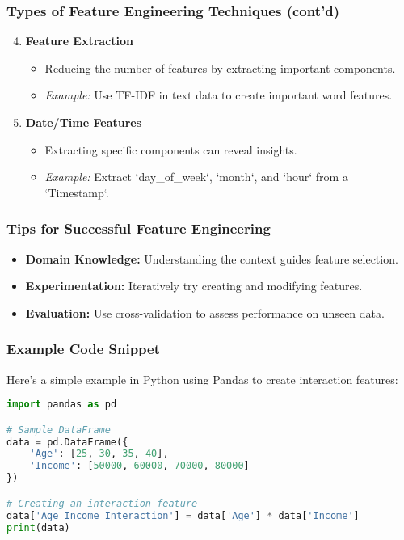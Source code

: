 \documentclass{beamer}
\begin{document}
\begin{frame}[fragile]
    \frametitle{Types of Feature Engineering Techniques (cont'd)}
    \begin{enumerate}
        \setcounter{enumi}{3}
        \item \textbf{Feature Extraction}
            \begin{itemize}
                \item Reducing the number of features by extracting important components.
                \item \textit{Example:} Use TF-IDF in text data to create important word features.
            \end{itemize}

        \item \textbf{Date/Time Features}
            \begin{itemize}
                \item Extracting specific components can reveal insights.
                \item \textit{Example:} Extract `day\_of\_week`, `month`, and `hour` from a `Timestamp`.
            \end{itemize}
    \end{enumerate}
\end{frame}

\begin{frame}[fragile]
    \frametitle{Tips for Successful Feature Engineering}
    \begin{itemize}
        \item \textbf{Domain Knowledge:} Understanding the context guides feature selection.
        \item \textbf{Experimentation:} Iteratively try creating and modifying features.
        \item \textbf{Evaluation:} Use cross-validation to assess performance on unseen data.
    \end{itemize}
\end{frame}

\begin{frame}[fragile]
    \frametitle{Example Code Snippet}
    Here’s a simple example in Python using Pandas to create interaction features:
    \begin{lstlisting}[language=Python]
import pandas as pd

# Sample DataFrame
data = pd.DataFrame({
    'Age': [25, 30, 35, 40],
    'Income': [50000, 60000, 70000, 80000]
})

# Creating an interaction feature
data['Age_Income_Interaction'] = data['Age'] * data['Income']
print(data)
    \end{lstlisting}
\end{frame}
\end{document}
